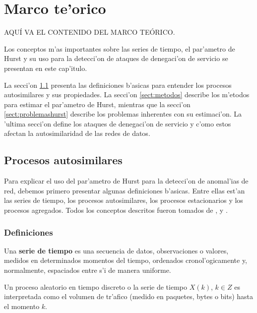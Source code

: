 \chapter{Marco te'orico} \label{chap:ssimilar}

AQU\'I VA EL CONTENIDO DEL MARCO TE\'ORICO.
\vspace{5 mm}

Los conceptos m'as importantes sobre las series de tiempo, el par'ametro de 
Hurst y su uso para la detecci'on de ataques de denegaci'on de servicio se 
presentan en este cap'itulo.

La secci'on \ref{sect:procesos} presenta las definiciones b'asicas para
entender los procesos autosimilares y sus propiedades. La secci'on 
\ref{sect:metodos} describe los m'etodos para estimar el par'ametro de Hurst, 
mientras que la secci'on \ref{sect:problemashurst} describe los problemas
inherentes con su estimaci'on. La 'ultima secci'on define los ataques de denegaci'on 
de servicio y c'omo estos afectan la autosimilaridad de las redes de datos.

\section{Procesos autosimilares} \label{sect:procesos}

Para explicar el uso del par'ametro de Hurst para la detecci'on de anomal'ias
de red, debemos primero presentar algunas definiciones b'asicas. Entre ellas
est'an las series de tiempo, los procesos autosimilares, los procesos
estacionarios y los procesos agregados. Todos los conceptos descritos fueron
tomados de \cite{556987}, \cite{1296068} y
\cite{willingerpaxsonrieditaqqulrddnt}.

\subsection{Definiciones} \label{subsect:defprop}

\begin{definicion} \label{def:xt}
Una {\bf serie de tiempo} es una secuencia de datos, observaciones o valores, 
medidos en determinados momentos del tiempo, ordenados cronol'ogicamente y,
normalmente, espaciados entre s'i de manera uniforme.
\end{definicion}

Un proceso aleatorio en tiempo discreto o la serie de tiempo $X(k)$, $k \in Z$
es interpretada como el volumen de tr'afico (medido en paquetes, bytes o bits)
hasta el momento $k$.

